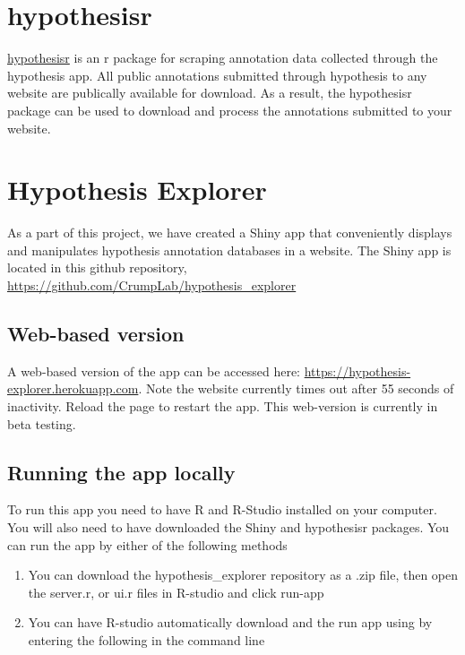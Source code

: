 \documentclass[
]{book}
\begin{document}
\hypertarget{hypothesisr-1}{%
\section{hypothesisr}\label{hypothesisr-1}}

\href{https://github.com/mdlincoln/hypothesisr}{hypothesisr} is an r package for scraping annotation data collected through the hypothesis app. All public annotations submitted through hypothesis to any website are publically available for download. As a result, the hypothesisr package can be used to download and process the annotations submitted to your website.

\hypertarget{hypothesis-explorer}{%
\section{Hypothesis Explorer}\label{hypothesis-explorer}}

As a part of this project, we have created a Shiny app that conveniently displays and manipulates hypothesis annotation databases in a website. The Shiny app is located in this github repository, \url{https://github.com/CrumpLab/hypothesis_explorer}

\hypertarget{web-based-version}{%
\subsection{Web-based version}\label{web-based-version}}

A web-based version of the app can be accessed here: \url{https://hypothesis-explorer.herokuapp.com}. Note the website currently times out after 55 seconds of inactivity. Reload the page to restart the app. This web-version is currently in beta testing.

\hypertarget{running-the-app-locally}{%
\subsection{Running the app locally}\label{running-the-app-locally}}

To run this app you need to have R and R-Studio installed on your computer. You will also need to have downloaded the Shiny and hypothesisr packages. You can run the app by either of the following methods

\begin{enumerate}
\def\labelenumi{\arabic{enumi}.}
\item
  You can download the hypothesis\_explorer repository as a .zip file, then open the server.r, or ui.r files in R-studio and click run-app
\item
  You can have R-studio automatically download and the run app using by entering the following in the command line
\end{enumerate}
\end{document}
